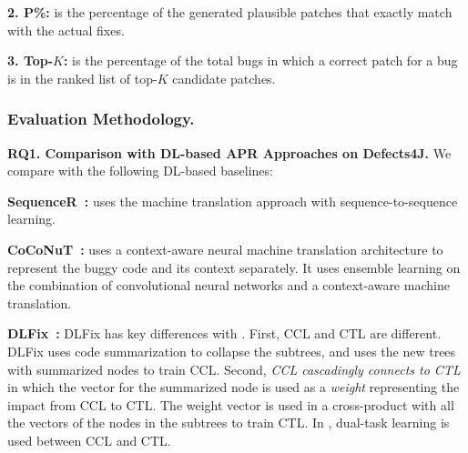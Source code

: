 {\bf 2. P\%:} is the percentage of the generated plausible patches
that exactly match with the actual fixes.

{\bf 3. Top-$K$:} is the percentage of the total bugs in which a correct
patch for a bug is in the ranked list of top-$K$ candidate patches.

\subsubsection{Evaluation Methodology.\\}

{\bf RQ1. Comparison with DL-based APR Approaches on Defects4J.}
We compare {\tool} with the following
DL-based baselines:



{\bf SequenceR~\cite{chen2018sequencer}: } uses the machine
translation approach with sequence-to-sequence learning.

{\bf CoCoNuT~\cite{lutellier2020coconut}:} uses a context-aware neural
machine translation architecture to represent the buggy code
and its context separately.
It uses ensemble learning on the combination of convolutional neural
networks and a context-aware machine translation.

{\bf DLFix~\cite{icse20}:} DLFix has key differences with {\tool}.
First, CCL and CTL are different. DLFix uses code summarization to
collapse the
subtrees, and uses the new trees with summarized nodes to train
CCL. Second, {\em CCL cascadingly connects to CTL} in which the
vector for the summarized node is used as a {\em weight} representing the
impact from CCL to CTL. The weight vector is used in a cross-product
with all the vectors of the nodes in the subtrees to train CTL. In
{\tool}, dual-task learning is used between CCL and CTL.

